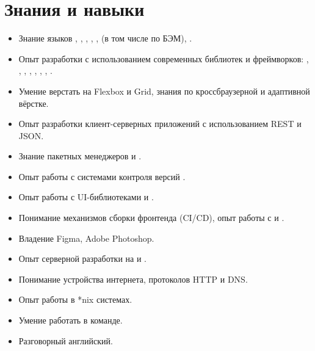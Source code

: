 \section*{Знания и навыки}

\begin{itemize}
    \item Знание языков , , , , ,  (в том числе по БЭМ), .
    \item Опыт разработки с использованием современных библиотек и фреймворков: , , , , , , , .
    \item Умение верстать на Flexbox и Grid, знания по кроссбраузерной и адаптивной вёрстке.
    \item Опыт разработки клиент-серверных приложений с использованием REST и JSON.
    \item Знание пакетных менеджеров  и .
    \item Опыт работы с системами контроля версий .
    \item Опыт работы с UI-библиотеками  и .
    \item Понимание механизмов сборки фронтенда (CI/CD), опыт работы с  и .
    \item Владение Figma, Adobe Photoshop.
    \item Опыт серверной разработки на  и .
    \item Понимание устройства интернета, протоколов HTTP и DNS.
    \item Опыт работы в *nix системах.
    \item Умение работать в команде.
    \item Разговорный английский.
\end{itemize}